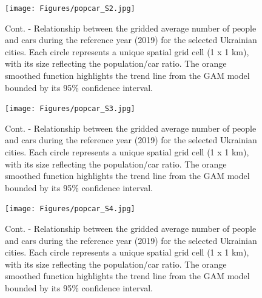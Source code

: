 \documentclass[sn-basic]{sn-jnl}%
\begin{document}
{\begin{appendices}
\begin{figure}[h!]
\begin{center}
\texttt{[image: Figures/popcar\_S2.jpg]}
\end{center}
\caption{Cont. - Relationship between the gridded average number of people and cars during the reference year (2019) for the selected Ukrainian cities. Each circle represents a unique spatial grid cell (1 x 1 km), with its size reflecting the population/car ratio. The orange smoothed function highlights the trend line from the GAM model bounded by its 95\% confidence interval.}
\label{figSM_PopCar_02}
\end{figure}


\begin{figure}[h!]
\begin{center}
\texttt{[image: Figures/popcar\_S3.jpg]}
\end{center}
\caption{Cont. - Relationship between the gridded average number of people and cars during the reference year (2019) for the selected Ukrainian cities. Each circle represents a unique spatial grid cell (1 x 1 km), with its size reflecting the population/car ratio. The orange smoothed function highlights the trend line from the GAM model bounded by its 95\% confidence interval.}
\label{figSM_PopCar_03}
\end{figure}


\begin{figure}[h!]
\begin{center}
\texttt{[image: Figures/popcar\_S4.jpg]}
\end{center}
\caption{Cont. - Relationship between the gridded average number of people and cars during the reference year (2019) for the selected Ukrainian cities. Each circle represents a unique spatial grid cell (1 x 1 km), with its size reflecting the population/car ratio. The orange smoothed function highlights the trend line from the GAM model bounded by its 95\% confidence interval.}
\label{figSM_PopCar_04}
\end{figure}



\end{appendices}}
\end{document}

